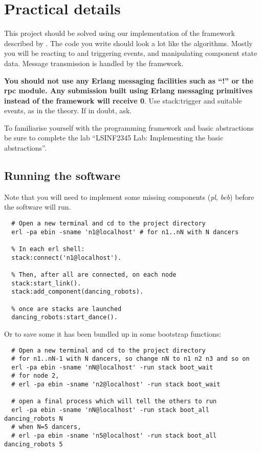 \documentclass[a4paper]{article}
\begin{document}
\section*{Practical details} %
\label{sec:practical_details}

This project should be solved using our implementation of the framework
described by \cite{cachin2011}. The code you write should look a lot like the
algorithms. Mostly you will be reacting to and triggering events, and
manipulating component state data. Message transmission is handled by the
framework.

\textbf{You should not use any Erlang messaging facilities such as ``!'' or the rpc
module. Any submission built using Erlang messaging primitives
instead of the framework will receive 0}. Use stack:trigger
and suitable events, as in the theory. If in doubt, ask.

To familiarise yourself with the programming framework and basic abstractions
be sure to complete the lab ``LSINF2345 Lab: Implementing the basic
abstractions''.

\subsection*{Running the software} %
\label{sub:running_the_software}

Note that you will need to implement some missing components (\emph{pl},
\emph{beb}) before the software will run.

\begin{verbatim}
  # Open a new terminal and cd to the project directory
  erl -pa ebin -sname 'n1@localhost' # for n1..nN with N dancers

  % In each erl shell:
  stack:connect('n1@localhost').

  % Then, after all are connected, on each node
  stack:start_link().
  stack:add_component(dancing_robots).

  % once are stacks are launched
  dancing_robots:start_dance().
\end{verbatim}

Or to save some it has been bundled up in some bootstrap functions:

\begin{verbatim}
  # Open a new terminal and cd to the project directory
  # for n1..nN-1 with N dancers, so change nN to n1 n2 n3 and so on
  erl -pa ebin -sname 'nN@localhost' -run stack boot_wait
  # for node 2,
  # erl -pa ebin -sname 'n2@localhost' -run stack boot_wait

  # open a final process which will tell the others to run
  erl -pa ebin -sname 'nN@localhost' -run stack boot_all dancing_robots N
  # when N=5 dancers,
  # erl -pa ebin -sname 'n5@localhost' -run stack boot_all dancing_robots 5
\end{verbatim}
\end{document}
